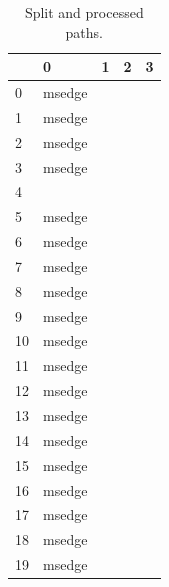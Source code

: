 \documentclass[a4paper,twoside,12pt]{book}
\begin{document}
\begin{appendices}
\begin{table}
	\centering
	\caption{Split and processed paths.}
	\label{id:tab:splitPaths}
	\begin{tabular}{lllll}
	\toprule
	{} &              0 &              1 &              2 &              3 \\
	\midrule
	0   &         msedge &                &                &                \\
	1   &         msedge &                &                &                \\
	2   &         msedge &                &                &                \\
	3   &         msedge &                &                &                \\
	4   &                &                &                &                \\
	5   &         msedge &                &                &                \\
	6   &         msedge &                &                &                \\
	7   &         msedge &                &                &                \\
	8   &         msedge &                &                &                \\
	9   &         msedge &                &                &                \\
	10  &         msedge &                &                &                \\
	11  &         msedge &                &                &                \\
	12  &         msedge &                &                &                \\
	13  &         msedge &                &                &                \\
	14  &         msedge &                &                &                \\
	15  &         msedge &                &                &                \\
	16  &         msedge &                &                &                \\
	17  &         msedge &                &                &                \\
	18  &         msedge &                &                &                \\
	19  &         msedge &                &                &                \\

\end{tabular}
\end{table}
\end{appendices}
\end{document}
